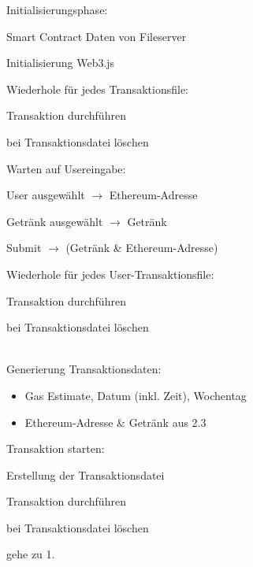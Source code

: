\begin{legal}
	\item Initialisierungsphase:
	\begin{legal}
		\item {} Smart Contract Daten von Fileserver
		\item Initialisierung Web3.js
		\item Wiederhole für jedes Transaktionsfile:
		\begin{legal}
			\item Transaktion durchführen
			\item bei  Transaktionsdatei löschen
		\end{legal}
	\end{legal}
	\item Warten auf Usereingabe:
	\begin{legal}
		\item User ausgewählt $\rightarrow$ Ethereum-Adresse
		\item Getränk ausgewählt $\rightarrow$ Getränk
		\item Submit $\rightarrow$ (Getränk \& Ethereum-Adresse)
	\end{legal}
	\item Wiederhole für jedes User-Transaktionsfile:
	\begin{legal}
		\item Transaktion durchführen
		\item bei  Transaktionsdatei löschen\\\\
	\end{legal}
	\item Generierung Transaktionsdaten:
	\begin{itemize}
		\item Gas Estimate, Datum (inkl. Zeit), Wochentag 
		\item Ethereum-Adresse \& Getränk aus 2.3
	\end{itemize}
	\item Transaktion starten:
	\begin{legal}
		\item Erstellung der Transaktionsdatei
		\item Transaktion durchführen
		\item bei  Transaktionsdatei löschen
		\item gehe zu 1.
	\end{legal} 	
\end{legal}

